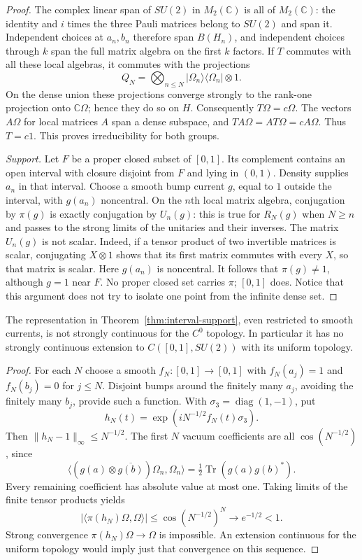 \begin{proof}
The complex linear span of $SU(2)$ in $M_2(\mathbb C)$ is all of
$M_2(\mathbb C)$: the identity and $i$ times the three Pauli matrices
belong to $SU(2)$ and span it. Independent choices at $a_n,b_n$
therefore span $B(H_n)$, and independent choices through $k$ span
the full matrix algebra on the first $k$ factors. If $T$ commutes
with all these local algebras, it commutes with the projections
\[
 Q_N=\bigotimes_{n\leq N}|\Omega_n\rangle\langle\Omega_n|\otimes1.
\]
On the dense union these projections converge strongly to the
rank-one projection onto $\mathbb C\Omega$; hence they do so on
$H$. Consequently $T\Omega=c\Omega$. The vectors $A\Omega$ for
local matrices $A$ span a dense subspace, and
$TA\Omega=AT\Omega=cA\Omega$. Thus $T=c1$. This proves
irreducibility for both groups.

\emph{Support.}
Let $F$ be a proper closed subset of $[0,1]$. Its complement
contains an open interval with closure disjoint from $F$ and lying
in $(0,1)$. Density supplies $a_n$ in that interval. Choose a smooth
bump current $g$, equal to $1$ outside the interval, with $g(a_n)$
noncentral. On the $n$th local matrix algebra, conjugation by
$\pi(g)$ is exactly conjugation by $U_n(g)$: this is true for
$R_N(g)$ when $N\geq n$ and passes to the strong limits of the
unitaries and their inverses. The matrix $U_n(g)$ is not scalar.
Indeed, if a tensor product of two invertible matrices is scalar,
conjugating $X\otimes1$ shows that its first matrix commutes with
every $X$, so that matrix is scalar. Here $g(a_n)$ is noncentral.
It follows that $\pi(g)\ne1$, although $g=1$ near $F$. No proper
closed set carries $\pi$; $[0,1]$ does. Notice that this argument
does not try to isolate one point from the infinite dense set.
\end{proof}

\begin{proposition}\ours{}
\label{prop:not-czero}
The representation in Theorem~\ref{thm:interval-support}, even
restricted to smooth currents, is not strongly continuous for the
$C^0$ topology. In particular it has no strongly continuous
extension to $C([0,1],SU(2))$ with its uniform topology.
\end{proposition}

\begin{proof}
For each $N$ choose a smooth $f_N:[0,1]\to[0,1]$ with
$f_N(a_j)=1$ and $f_N(b_j)=0$ for $j\leq N$. Disjoint bumps around
the finitely many $a_j$, avoiding the finitely many $b_j$, provide
such a function. With $\sigma_3=\operatorname{diag}(1,-1)$, put
\[
 h_N(t)=\exp(iN^{-1/2}f_N(t)\sigma_3).
\]
Then $\|h_N-1\|_\infty\leq N^{-1/2}$. The first $N$ vacuum
coefficients are all $\cos(N^{-1/2})$, since
\[
 \langle(g(a)\otimes\overline{g(b)})\Omega_n,\Omega_n\rangle
 =\tfrac12\operatorname{Tr}(g(a)g(b)^*).
\]
Every remaining coefficient has absolute value at most one.
Taking limits of the finite tensor products yields
\[
 |\langle\pi(h_N)\Omega,\Omega\rangle|
 \leq\cos(N^{-1/2})^N\longrightarrow e^{-1/2}<1.
\]
Strong convergence $\pi(h_N)\Omega\to\Omega$ is impossible.
An extension continuous for the uniform topology would imply just
that convergence on this sequence.
\end{proof}


